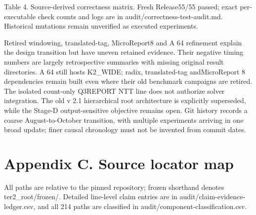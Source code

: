 \documentclass[10pt,letterpaper]{article}
\begin{document}
{\small\color{teal}Table 4. Source-derived correctness matrix. Fresh Release55/55 passed; exact per-executable check counts and logs are in audit/correctness-test-audit.md. Historical mutations remain unverified as executed experiments.\par}

Retired windowing, translated-tag, MicroReport8 and A 64 refinement explain the design transition but have uneven retained evidence. Their negative timing numbers are largely retrospective summaries with missing original result directories. A 64 still hosts K2\_WIDE; radix, translated-tag andMicroReport 8 dependencies remain built even where their old benchmark campaigns are retired. The isolated count-only Q3REPORT NTT line does not authorize solver integration. The old v 2.1 hierarchical root architecture is explicitly superseded, while the Stage-D output-sensitive objective remains open. Git history records a coarse August-to-October transition, with multiple experiments arriving in one broad update; finer causal chronology must not be invented from commit dates.


\section*{Appendix C. Source locator map}

All paths are relative to the pinned repository; frozen shorthand denotes ter2\_root/frozen/. Detailed line-level claim entries are in audit/claim-evidence-ledger.csv, and all 214 paths are classified in audit/component-classification.csv.
\end{document}
